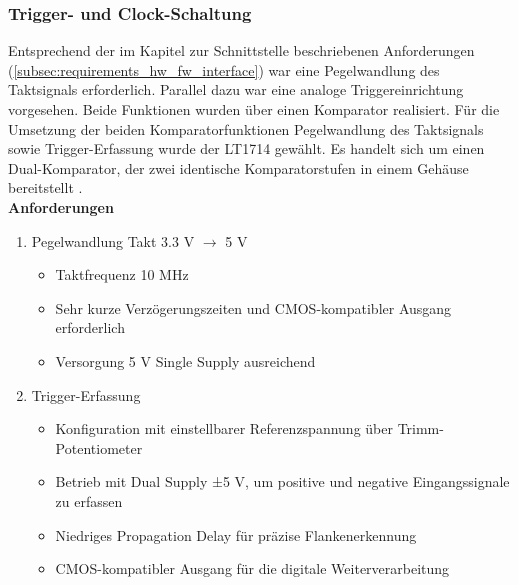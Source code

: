 \documentclass[a4paper, portrait, 12pt]{scrartcl} %
\begin{document}
\subsubsection{Trigger- und Clock-Schaltung}

Entsprechend der im Kapitel zur Schnittstelle beschriebenen Anforderungen (\autoref{subsec:requirements_hw_fw_interface}) war eine Pegelwandlung des Taktsignals erforderlich. Parallel dazu war eine analoge Triggereinrichtung vorgesehen. Beide Funktionen wurden über einen Komparator realisiert. Für die Umsetzung der beiden Komparatorfunktionen Pegelwandlung des Taktsignals sowie Trigger-Erfassung wurde der LT1714 gewählt. Es handelt sich um einen Dual-Komparator, der zwei identische Komparatorstufen in einem Gehäuse bereitstellt \cite[S. 1]{LinearTechnology1714}.\\

\textbf{Anforderungen}

\begin{enumerate}
    \item Pegelwandlung Takt 3.3 V $\rightarrow$ 5 V
    \begin{itemize}
        \item Taktfrequenz 10 MHz
        \item Sehr kurze Verzögerungszeiten und CMOS-kompatibler Ausgang erforderlich
        \item Versorgung 5 V Single Supply ausreichend
    \end{itemize}
    \item Trigger-Erfassung
    \begin{itemize}
        \item Konfiguration mit einstellbarer Referenzspannung über Trimm-Potentiometer
        \item Betrieb mit Dual Supply ±5 V, um positive und negative Eingangssignale zu erfassen
        \item Niedriges Propagation Delay für präzise Flankenerkennung
        \item CMOS-kompatibler Ausgang für die digitale Weiterverarbeitung
    \end{itemize}
\end{enumerate}
\end{document}
